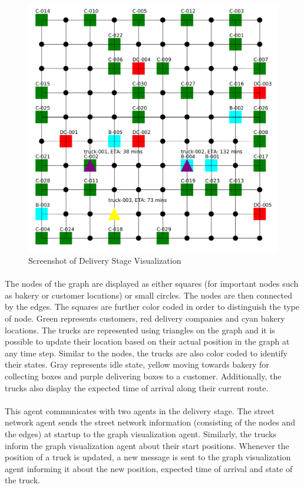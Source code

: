 \documentclass[11pt, a4paper]{article}
\begin{document}
\begin{figure}[h!]
	\centering
	\includegraphics[width=\textwidth]{Visualization.png}
	\caption{Screenshot of Delivery Stage Visualization}
	\label{VisualizationScreenshot}
\end{figure}

\paragraph{}
The nodes of the graph are displayed as either squares (for important nodes such as bakery or customer locations) or small circles. The nodes are then connected by the edges. The squares are further color coded in order to distinguish the type of node. Green represents customers, red delivery companies and cyan bakery locations. The trucks are represented using triangles on the graph and it is possible to update their location based on their actual position in the graph at any time step. Similar to the nodes, the trucks are also color coded to identify their states. Gray represents idle state, yellow moving towards bakery for collecting boxes and purple delivering boxes to a customer. Additionally, the trucks also display the expected time of arrival along their current route.

\paragraph{}
This agent communicates with two agents in the delivery stage. The street network agent sends the street network information (consisting of the nodes and the edges) at startup to the graph visualization agent. Similarly, the trucks inform the graph visualization agent about their start positions. Whenever the position of a truck is updated, a new message is sent to the graph visualization agent informing it about the new position, expected time of arrival and state of the truck.
\end{document}
